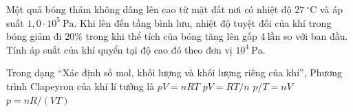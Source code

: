 \begin{ex}
Một quả bóng thám không dâng lên cao từ mặt đất nơi có nhiệt độ $27\ ^\circ\mathrm{C}$ và áp suất $1,0 \cdot 10^5\ \mathrm{Pa}$. Khi lên đến tầng bình lưu, nhiệt độ tuyệt đối của khí trong bóng giảm đi $20\%$ trong khi thể tích của bóng tăng lên gấp $4\ \text{lần}$ so với ban đầu. Tính áp suất của khí quyển tại độ cao đó theo đơn vị $10^4\ \mathrm{Pa}$.
\end{ex}

\begin{ex}
Trong dạng “Xác định số mol, khối lượng và khối lượng riêng của khí”, Phương trình Clapeyron của khí lí tưởng là
\choice
{\True $pV=nRT$}
{$pV=RT/n$}
{$p/T=nV$}
{$p=nR/(VT)$}
\end{ex}

